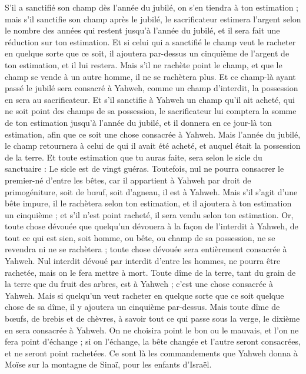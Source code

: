 \begin{multicols}{2}
S'il a sanctifié son champ dès l'année du jubilé, on s'en tiendra à ton estimation ;
mais s'il sanctifie son champ après le jubilé, le sacrificateur estimera l'argent selon le nombre des années qui restent jusqu'à l'année du jubilé, et il sera fait une réduction sur ton estimation.
Et si celui qui a sanctifié le champ veut le racheter en quelque sorte que ce soit, il ajoutera par-dessus un cinquième de l'argent de ton estimation, et il lui restera.
Mais s'il ne rachète point le champ, et que le champ se vende à un autre homme, il ne se rachètera plus.
Et ce champ-là ayant passé le jubilé sera consacré à Yahweh, comme un champ d'interdit, la possession en sera au sacrificateur.
Et s'il sanctifie à Yahweh un champ qu'il ait acheté, qui ne soit point des champs de sa possession,
le sacrificateur lui comptera la somme de ton estimation jusqu'à l'année du jubilé, et il donnera en ce jour-là ton estimation, afin que ce soit une chose consacrée à Yahweh.
Mais l'année du jubilé, le champ retournera à celui de qui il avait été acheté, et auquel était la possession de la terre.
Et toute estimation que tu auras faite, sera selon le sicle du sanctuaire : Le sicle est de vingt guéras.
Toutefois, nul ne pourra consacrer le premier-né d'entre les bêtes, car il appartient à Yahweh par droit de primogéniture, soit de bœuf, soit d'agneau, il est à Yahweh.
Mais s'il s'agit d'une bête impure, il le rachètera selon ton estimation, et il ajoutera à ton estimation un cinquième ; et s'il n'est point racheté, il sera vendu selon ton estimation.
Or, toute chose dévouée que quelqu'un dévouera à la façon de l'interdit à Yahweh, de tout ce qui est sien, soit homme, ou bête, ou champ de sa possession, ne se revendra ni ne se rachètera ; toute chose dévouée sera entièrement consacrée à Yahweh.
Nul interdit dévoué par interdit d’entre les hommes, ne pourra être rachetée, mais on le fera mettre à mort.
Toute dîme de la terre, tant du grain de la terre que du fruit des arbres, est à Yahweh ; c'est une chose consacrée à Yahweh.
Mais si quelqu'un veut racheter en quelque sorte que ce soit quelque chose de sa dîme, il y ajoutera un cinquième par-dessus.
Mais toute dîme de bœufs, de brebis et de chèvres, à savoir tout ce qui passe sous la verge, le dixième en sera consacrée à Yahweh.
On ne choisira point le bon ou le mauvais, et l'on ne fera point d'échange ; si on l'échange, la bête changée et l'autre seront consacrées, et ne seront point rachetées.
Ce sont là les commandements que Yahweh donna à Moïse sur la montagne de Sinaï, pour les enfants d'Israël.
\PPE{}
\end{multicols}
